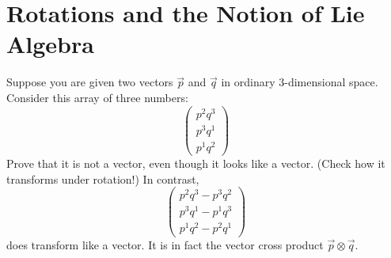 \documentclass[../group-theory-in-a-nutshell-for-physicists.tex]{subfiles}
\begin{document}
\printanswers

\section{Rotations and the Notion of Lie Algebra}

\begin{questions}
\printanswers

\question Suppose you are given two vectors $\overrightarrow{p}$ and
$\overrightarrow{q}$ in ordinary $3$-dimensional space. Consider
this array of three numbers:
\[
\begin{pmatrix}
p^{2}q^{3} \\
p^{3}q^{1} \\
p^{1}q^{2}
\end{pmatrix}
\]
Prove that it is not a vector, even though it looks like a vector.
(Check how it transforms under rotation!) In contrast,
\[
\begin{pmatrix}
p^{2}q^{3} - p^{3}q^{2} \\
p^{3}q^{1} - p^{1}q^{3} \\
p^{1}q^{2} - p^{2}q^{1}
\end{pmatrix}
\]
does transform like a vector. It is in fact the vector cross product
$\overrightarrow{p} \otimes \overrightarrow{q}$.


\end{questions}
\end{document}
